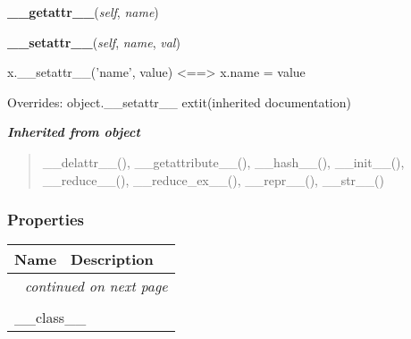     \vspace{0.5ex}

\hspace{.8\funcindent}\begin{boxedminipage}{\funcwidth}

    \raggedright \textbf{\_\_getattr\_\_}(\textit{self}, \textit{name})

\setlength{\parskip}{2ex}
\setlength{\parskip}{1ex}
    \end{boxedminipage}

    \vspace{0.5ex}

\hspace{.8\funcindent}\begin{boxedminipage}{\funcwidth}

    \raggedright \textbf{\_\_setattr\_\_}(\textit{self}, \textit{name}, \textit{val})

\setlength{\parskip}{2ex}
    x.\_\_setattr\_\_('name', value) {\textless}=={\textgreater} x.name = 
    value

\setlength{\parskip}{1ex}
      Overrides: object.\_\_setattr\_\_ 	extit{(inherited documentation)}

    \end{boxedminipage}


\large{\textbf{\textit{Inherited from object}}}

\begin{quote}
\_\_delattr\_\_(), \_\_getattribute\_\_(), \_\_hash\_\_(), \_\_init\_\_(), \_\_reduce\_\_(), \_\_reduce\_ex\_\_(), \_\_repr\_\_(), \_\_str\_\_()
\end{quote}


  \subsubsection{Properties}

    \vspace{-1cm}
\hspace{\varindent}\begin{longtable}{|p{\varnamewidth}|p{\vardescrwidth}|l}
\cline{1-2}
\cline{1-2} \centering \textbf{Name} & \centering \textbf{Description}& \\
\cline{1-2}
\endhead\cline{1-2}\multicolumn{3}{r}{\small\textit{continued on next page}}\\\endfoot\cline{1-2}
\endlastfoot\multicolumn{2}{|l|}{\textit{Inherited from object}}\\
\multicolumn{2}{|p{\varwidth}|}{\raggedright \_\_class\_\_}\\
\cline{1-2}
\end{longtable}


